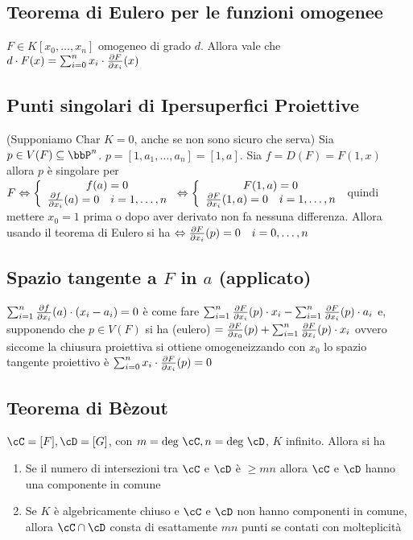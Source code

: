 \documentclass[a4paper,NoNotes,GeneralMath]{stdmdoc}
\newcommand{\Char}{\text{Char }}
\begin{document}
	\subsection*{Teorema di Eulero per le funzioni omogenee}
	$F \in K[x_0, \ldots, x_n]$ omogeneo di grado $d$. Allora vale che $d \cdot F (x) = \sum_{i=0}^{n} x_i \cdot \dpar{F}{x_i} (x)$
	
	\subsection*{Punti singolari di Ipersuperfici Proiettive}
	(Supponiamo $\Char K = 0$, anche se non sono sicuro che serva) Sia $p \in V(F) \subseteq \bbP^n$. $p = [1, a_1, \ldots, a_n] = [1, a]$. Sia $f = D(F) = F(1,x)$ allora $p$ è singolare per $F \sse \left\{ \begin{array}{c} f(a) = 0 \\ \dpar{f}{x_i}(a) = 0 \quad i = 1, \ldots, n \end{array} \right. \sse \left\{ \begin{array}{c} F(1,a) = 0 \\ \dpar{F}{x_i} (1,a) = 0 \quad i = 1, \ldots, n \end{array} \right.$ quindi mettere $x_0 = 1 $ prima o dopo aver derivato non fa nessuna differenza. Allora usando il teorema di Eulero si ha $\sse \dpar{F}{x_i}(p) = 0 \quad i=0,\ldots, n$
	
	\subsection*{Spazio tangente a $F$ in $a$ (applicato)}
	$\sum_{i=1}^{n} \dpar{f}{x_i} (a) \cdot (x_i - a_i) = 0$ è come fare $\sum_{i=1}^{n} \dpar{F}{x_i} (p) \cdot x_i - \sum_{i=1}^{n} \dpar{F}{x_i} (p) \cdot a_i$ e, supponendo che $p \in V(F)$ si ha (eulero) $ = \dpar{F}{x_0} (p) + \sum_{i=1}^n \dpar{F}{x_i}(p) \cdot x_i$ ovvero siccome la chiusura proiettiva si ottiene omogeneizzando con $x_0$ lo spazio tangente proiettivo è $\sum_{i=0}^n x_i \cdot \dpar{F}{x_i}(p) = 0$
	
	\subsection*{Teorema di Bèzout}
	$\cC = [F], \cD = [G]$, con $m = \Deg \cC, n = \Deg \cD$, $K$ infinito. Allora si ha
	\begin{enumerate}
		\item Se il numero di intersezioni tra $\cC$ e $\cD$ è $\ge mn$ allora $\cC$ e $\cD$ hanno una componente in comune
		\item Se $K$ è algebricamente chiuso e $\cC$ e $\cD$ non hanno componenti in comune, allora $\cC \cap \cD$ consta di esattamente $mn$ punti se contati con molteplicità
	\end{enumerate}
	
\end{document}

